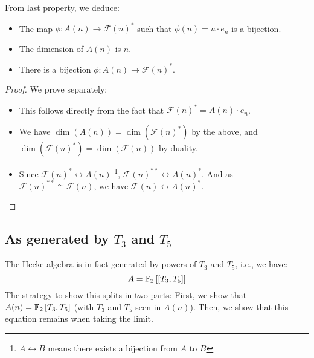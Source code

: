 \begin{corollary}
	From last property, we deduce:
	\begin{itemize}
		\item The map $\phi: A(n) \to \mathcal{F}(n)^*$ such that $\phi(u) = u \cdot e_n$ is a bijection.
		\item The dimension of $A(n)$ is $n$.
		\item There is a bijection $\phi: A(n) \to \mathcal{F}(n)^*$.
	\end{itemize}
\end{corollary}
\begin{proof}
	We prove separately:
	\begin{itemize}
		\item This follows directly from the fact that $\mathcal{F}(n)^* = A(n) \cdot e_n$.
		\item We have $\dim(A(n)) = \dim(\mathcal{F}(n)^*)$ by the above, and $\dim(\mathcal{F}(n)^*) = \dim(\mathcal{F}(n))$ by duality.
		\item Since $\mathcal{F}(n)^* \leftrightarrow A(n)$
		\footnote{$A \leftrightarrow B$ means there exists a bijection from $A$ to $B$}, $\mathcal{F}(n)^{**} \leftrightarrow A(n)^*$.
		And as $\mathcal{F}(n)^{**} \cong \mathcal{F}(n)$, we have $\mathcal{F}(n) \leftrightarrow A(n)^*$.
	\end{itemize}
\end{proof}



\subsection{As generated by $T_3$ and $T_5$}
The Hecke algebra is in fact generated by powers of $T_3$ and $T_5$, i.e., we have:
$$
A = \mathbb{F}_2 \left[\left[ T_3, T_5 \right]\right] 
$$
The strategy to show this splits in two parts:
First, we show that $A(n) = \mathbb{F}_2 \left[ T_3, T_5 \right]$ (with $T_3$ and $T_5$ seen in $A(n)$).
Then, we show that this equation remains when taking the limit.

